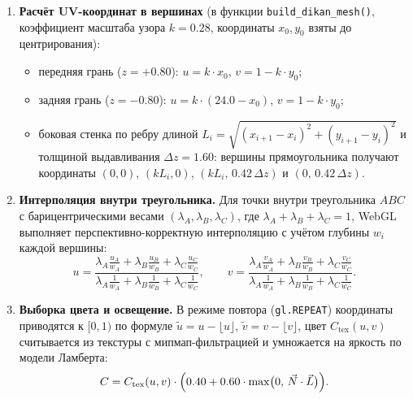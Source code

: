 \documentclass[11pt,a4paper]{article}
\begin{document}
\begin{enumerate}
    \item \textbf{Расчёт UV-координат в вершинах} (в функции \texttt{build\_dikan\_mesh()}, коэффициент масштаба узора $k = 0.28$, координаты $x_0, y_0$ взяты до центрирования):
    \begin{itemize}
        \item передняя грань ($z = +0.80$): \quad $u = k \cdot x_0$, \quad $v = 1 - k \cdot y_0$;
        \item задняя грань ($z = -0.80$): \quad $u = k \cdot (24.0 - x_0)$, \quad $v = 1 - k \cdot y_0$;
        \item боковая стенка по ребру длиной $L_i = \sqrt{(x_{i+1} - x_i)^2 + (y_{i+1} - y_i)^2}$ и толщиной выдавливания $\Delta z = 1.60$: вершины прямоугольника получают координаты $(0, 0)$, $(k L_i, 0)$, $(k L_i, \, 0.42\,\Delta z)$ и $(0, \, 0.42\,\Delta z)$.
    \end{itemize}

    \item \textbf{Интерполяция внутри треугольника.} Для точки внутри треугольника $ABC$ с барицентрическими весами $(\lambda_A, \lambda_B, \lambda_C)$, где $\lambda_A + \lambda_B + \lambda_C = 1$, WebGL выполняет перспективно-корректную интерполяцию с учётом глубины $w_i$ каждой вершины:
    \begin{equation}
        u = \frac{\lambda_A \frac{u_A}{w_A} + \lambda_B \frac{u_B}{w_B} + \lambda_C \frac{u_C}{w_C}}{\lambda_A \frac{1}{w_A} + \lambda_B \frac{1}{w_B} + \lambda_C \frac{1}{w_C}}, \qquad
        v = \frac{\lambda_A \frac{v_A}{w_A} + \lambda_B \frac{v_B}{w_B} + \lambda_C \frac{v_C}{w_C}}{\lambda_A \frac{1}{w_A} + \lambda_B \frac{1}{w_B} + \lambda_C \frac{1}{w_C}}.
    \end{equation}

    \item \textbf{Выборка цвета и освещение.} В режиме повтора (\texttt{gl.REPEAT}) координаты приводятся к $[0, 1)$ по формуле $\tilde{u} = u - \lfloor u \rfloor$, $\tilde{v} = v - \lfloor v \rfloor$, цвет $C_{\text{tex}}(u, v)$ считывается из текстуры с мипмап-фильтрацией и умножается на яркость по модели Ламберта:
    \begin{equation}
        C = C_{\text{tex}}(u, v) \cdot \Bigl(0.40 + 0.60 \cdot \max\bigl(0, \, \vec{N} \cdot \vec{L}\bigr)\Bigr).
    \end{equation}
\end{enumerate}
\end{document}
